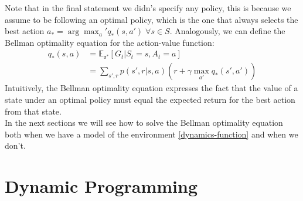 Note that in the final statement we didn's specify any policy, this is because we assume to be following an optimal policy, which is the one that always selects the best action $a_* = \arg \max_a' q_*(s, a') \; \forall s \in S$.
Analogously, we can define the Bellman optimality equation for the action-value function:
\begin{equation}
    \begin{split}
        q_{*}(s, a) & = \mathds{E_{\pi^*}}[G_t | S_t = s, A_t = a] \\
        & = \sum_{s', r} p(s', r | s, a) (r + \gamma \max_{a'} q_*(s', a'))
    \end{split}
    \label{bellman-optimality-equation-action-value}
\end{equation}
Intuitively, the Bellman optimality equation expresses the fact that the value of a state under an optimal policy must equal the expected return for the best action from that state.\\
In the next sections we will see how to solve the Bellman optimality equation both when we have a model of the environment \ref{dynamics-function} and when we don't.

\section{Dynamic Programming}
